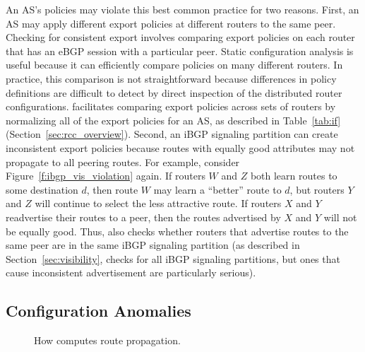 An AS's policies may violate this best common practice for two reasons.
First, an AS may apply different export policies at different routers to
the same peer.  Checking for consistent export involves comparing export
policies on each router that has an eBGP session with a particular peer.
Static configuration analysis is useful because it can efficiently
compare policies on 
many different routers.  In practice, this comparison is not
straightforward because differences in policy definitions are difficult
to detect by direct inspection of the distributed router configurations.
\rcc facilitates comparing export policies across sets of routers by
normalizing all of the export policies for an AS, as described in
Table~\ref{tab:if} (Section~\ref{sec:rcc_overview}).  Second, an iBGP
signaling partition can 
create inconsistent export policies because routes with equally good
attributes may not propagate to all peering routes.  For example,
consider Figure~\ref{f:ibgp_vis_violation} again.  If routers $W$ and
$Z$ both learn routes to some destination $d$, then route $W$ may learn
a ``better'' route to $d$, but routers $Y$ and $Z$ will continue to
select the less attractive route.  If routers $X$ and $Y$ readvertise
their routes to a peer, then the routes advertised by $X$ and $Y$ will
not be equally good.  Thus, \rcc also checks whether routers that
advertise routes to the same peer are in the same iBGP signaling
partition (as described in Section~\ref{sec:visibility}, \rcc checks for
all iBGP signaling partitions, but ones that cause inconsistent
advertisement are particularly serious).

\subsection{Configuration Anomalies}

\begin{figure}
\begin{center}
\begin{psfrags}
\end{psfrags}
\end{center}
\caption{How \rcc computes route propagation.}
\label{fig:policy_closure}
\end{figure}

